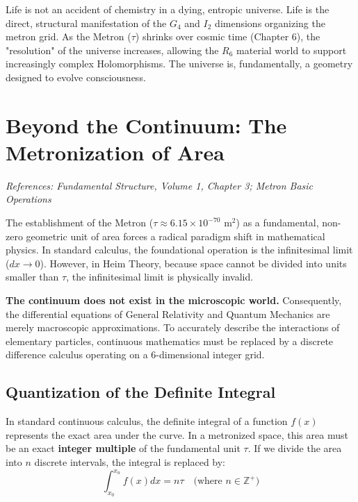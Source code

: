 \documentclass[11pt,a4paper,oneside]{article}
\begin{document}
\begin{tcolorbox}[colback=white, colframe=theoryred, title=\textbf{Conclusion of the $R_{12}$ Framework}]
Life is not an accident of chemistry in a dying, entropic universe. Life is the direct, structural manifestation of the $G_4$ and $I_2$ dimensions organizing the metron grid. As the Metron ($\tau$) shrinks over cosmic time (Chapter 6), the "resolution" of the universe increases, allowing the $R_6$ material world to support increasingly complex Holomorphisms. The universe is, fundamentally, a geometry designed to evolve consciousness.
\end{tcolorbox}
\section{Beyond the Continuum: The Metronization of Area}
\label{sec:metron_calculus}

\textit{References: Fundamental Structure, Volume 1, Chapter 3; Metron Basic Operations}

The establishment of the Metron ($\tau \approx 6.15 \times 10^{-70} \text{ m}^2$) as a fundamental, non-zero geometric unit of area forces a radical paradigm shift in mathematical physics. In standard calculus, the foundational operation is the infinitesimal limit ($dx \to 0$). However, in Heim Theory, because space cannot be divided into units smaller than $\tau$, the infinitesimal limit is physically invalid. 

\textbf{The continuum does not exist in the microscopic world.} Consequently, the differential equations of General Relativity and Quantum Mechanics are merely macroscopic approximations. To accurately describe the interactions of elementary particles, continuous mathematics must be replaced by a discrete difference calculus operating on a 6-dimensional integer grid.

\subsection{Quantization of the Definite Integral}

In standard continuous calculus, the definite integral of a function $f(x)$ represents the exact area under the curve. In a metronized space, this area must be an exact \textbf{integer multiple} of the fundamental unit $\tau$. If we divide the area into $n$ discrete intervals, the integral is replaced by:
\begin{equation}
    \int_{x_0}^{x_n} f(x)dx = n\tau \quad \text{(where $n \in \mathbb{Z}^+$)}
\end{equation}
\end{document}
